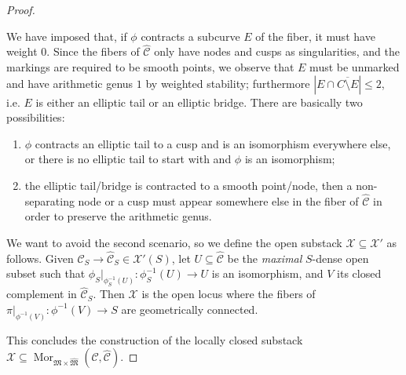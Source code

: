 \documentclass[11pt]{amsart}
\renewcommand{\to}{\rightarrow}
\newcommand{\cC}{\mathcal C}
\newcommand{\hC}{\widehat{\mathcal C}}
\newcommand{\MM}{\mathfrak M}
\newcommand{\hM}{\widehat{\mathfrak M}}
\theoremstyle{plain}
\theoremstyle{definition}
\begin{document}
\begin{proof}
\begin{description}[labelindent=0cm,leftmargin=\parindent]
\item[Step 4] We have imposed that, if $\phi$ contracts a subcurve $E$ of the fiber, it must have weight $0$. Since the fibers of $\hC$ only have nodes and cusps as singularities, and the markings are required to be smooth points, we observe that $E$ must be unmarked and have arithmetic genus $1$ by weighted stability; furthermore $\left|E\cap\overline{C\setminus E}\right|\leq 2$, i.e. $E$ is either an elliptic tail or an elliptic bridge. There are basically two possibilities:
\begin{enumerate}
\item $\phi$ contracts an elliptic tail to a cusp and is an isomorphism everywhere else, or there is no elliptic tail to start with and $\phi$ is an isomorphism;
\item the elliptic tail/bridge is contracted to a smooth point/node, then a non-separating node or a cusp must appear somewhere else in the fiber of $\hC$ in order to preserve the arithmetic genus.
\end{enumerate} 
We want to avoid the second scenario, so we define the open substack $\mathcal X\subseteq \mathcal X'$ as follows.
Given $\mathcal{C}_S\to\hC_S\in\mathcal X'(S)$, let $U\subseteq \hC$ be the \emph{maximal} $S$-dense open subset such that $\phi_S|_{\phi_S^{-1}(U)}\colon\phi_S^{-1}(U)\to U$ is an isomorphism, and $V$ its closed complement in $\hC_S$. 
Then $\mathcal X$ is the open locus \cite[\href{http://stacks.math.columbia.edu/tag/055G}{Tag 055G}]{stacks-project} where the fibers of $\pi|_{\phi^{-1}(V)}\colon \phi^{-1}(V)\to S$ are geometrically connected.
\end{description} 
This concludes the construction of the locally closed substack $\mathcal X\subseteq \operatorname{Mor}_{\MM\times\hM}(\cC,\hC)$.
 \end{proof}
 
\end{document}

